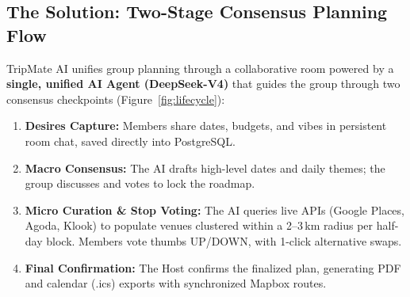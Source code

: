 \documentclass[11pt,a4paper]{article}
\begin{document}
\subsection{The Solution: Two-Stage Consensus Planning Flow}
TripMate AI unifies group planning through a collaborative room powered by a \textbf{single, unified AI Agent (DeepSeek-V4)} that guides the group through two consensus checkpoints (Figure~\ref{fig:lifecycle}):
\begin{enumerate}
\item \textbf{Desires Capture:} Members share dates, budgets, and vibes in persistent room chat, saved directly into PostgreSQL.
\item \textbf{Macro Consensus:} The AI drafts high-level dates and daily themes; the group discusses and votes to lock the roadmap.
\item \textbf{Micro Curation \& Stop Voting:} The AI queries live APIs (Google Places, Agoda, Klook) to populate venues clustered within a 2--3\,km radius per half-day block. Members vote thumbs UP/DOWN, with 1-click alternative swaps.
\item \textbf{Final Confirmation:} The Host confirms the finalized plan, generating PDF and calendar (.ics) exports with synchronized Mapbox routes.
\end{enumerate}
\end{document}
